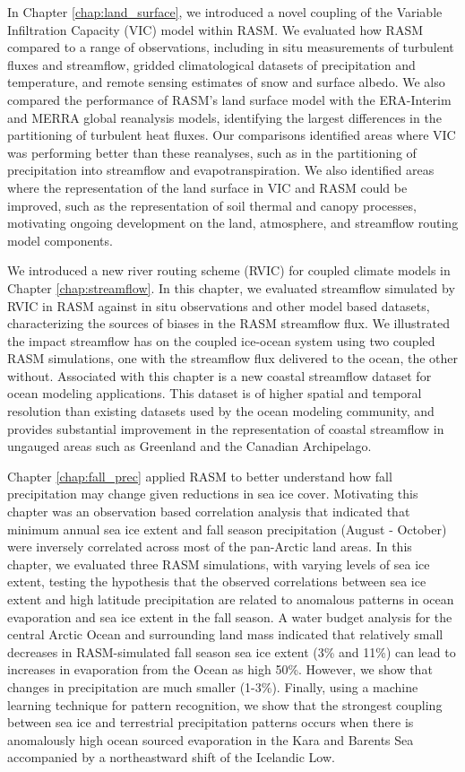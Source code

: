 In Chapter \ref{chap:land_surface}, we introduced a novel coupling of the Variable Infiltration Capacity (VIC) model within RASM.
We evaluated how RASM compared to a range of observations, including in situ measurements of turbulent fluxes and streamflow, gridded climatological datasets of precipitation and temperature, and remote sensing estimates of snow and surface albedo.
We also compared the performance of RASM's land surface model with the ERA-Interim and MERRA global reanalysis models, identifying the largest differences in the partitioning of turbulent heat fluxes.
Our comparisons identified areas where VIC was performing better than these reanalyses, such as in the partitioning of precipitation into streamflow and evapotranspiration.
We also identified areas where the representation of the land surface in VIC and RASM could be improved, such as the representation of soil thermal and canopy processes, motivating ongoing development on the land, atmosphere, and streamflow routing model components.

We introduced a new river routing scheme (RVIC) for coupled climate models in Chapter \ref{chap:streamflow}.
In this chapter, we evaluated streamflow simulated by RVIC in RASM against in situ observations and other model based datasets, characterizing the sources of biases in the RASM streamflow flux.
We illustrated the impact streamflow has on the coupled ice-ocean system using two coupled RASM simulations, one with the streamflow flux delivered to the ocean, the other without.
Associated with this chapter is a new coastal streamflow dataset for ocean modeling applications.
This dataset is of higher spatial and temporal resolution than existing datasets used by the ocean modeling community, and provides substantial improvement in the representation of coastal streamflow in ungauged areas such as Greenland and the Canadian Archipelago.

Chapter \ref{chap:fall_prec} applied RASM to better understand how fall precipitation may change given reductions in sea ice cover.
Motivating this chapter was an observation based correlation analysis that indicated that minimum annual sea ice extent and fall season precipitation (August - October) were inversely correlated across most of the pan-Arctic land areas.
In this chapter, we evaluated three RASM simulations, with varying levels of sea ice extent, testing the hypothesis that the observed correlations between sea ice extent and high latitude precipitation are related to anomalous patterns in ocean evaporation and sea ice extent in the fall season.
A water budget analysis for the central Arctic Ocean and surrounding land mass indicated that relatively small decreases in RASM-simulated fall season sea ice extent (3\% and 11\%) can lead to increases in evaporation from the Ocean as high 50\%.
However, we show that changes in precipitation are much smaller (1-3\%).
Finally, using a machine learning technique for pattern recognition, we show that the strongest coupling between sea ice and terrestrial precipitation patterns occurs when there is anomalously high ocean sourced evaporation in the Kara and Barents Sea accompanied by a northeastward shift of the Icelandic Low.

